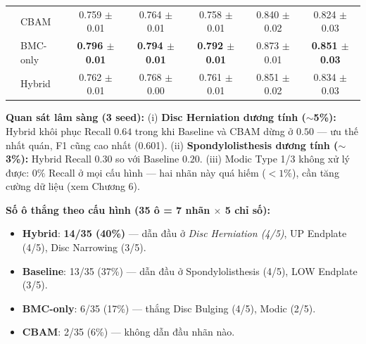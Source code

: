 \begin{table}[H]
{\begin{tabular}{llccccc}
 & CBAM     & 0.759 $\pm$ 0.01 & 0.764 $\pm$ 0.01 & 0.758 $\pm$ 0.01 & 0.840 $\pm$ 0.02 & 0.824 $\pm$ 0.03 \\
 & BMC-only & \textbf{0.796 $\pm$ 0.01} & \textbf{0.794 $\pm$ 0.01} & \textbf{0.792 $\pm$ 0.01} & 0.873 $\pm$ 0.01 & \textbf{0.851 $\pm$ 0.03} \\
 & Hybrid   & 0.762 $\pm$ 0.01 & 0.768 $\pm$ 0.00 & 0.761 $\pm$ 0.01 & 0.851 $\pm$ 0.02 & 0.834 $\pm$ 0.03 \\
\bottomrule
\end{tabular}%
}
\end{table}

\begin{table}[H]
\centering
\caption{Recall của các nhãn minority lâm sàng quan trọng (3-seed mean$\pm$std).}
\label{tab:spider_minority_recall}
\renewcommand{\arraystretch}{1.2}
\setlength{\tabcolsep}{4pt}
\end{table}

\textbf{Quan sát lâm sàng (3 seed):} (i) \textbf{Disc Herniation dương tính ($\sim$5\%):} Hybrid khôi phục Recall $0.64$ trong khi Baseline và CBAM dừng ở $0.50$ --- ưu thế nhất quán, F1 cũng cao nhất (0.601). (ii) \textbf{Spondylolisthesis dương tính ($\sim$3\%):} Hybrid Recall $0.30$ so với Baseline $0.20$. (iii) Modic Type 1/3 không xử lý được: $0\%$ Recall ở mọi cấu hình --- hai nhãn này quá hiếm ($<1\%$), cần tăng cường dữ liệu (xem Chương 6).

\textbf{Số ô thắng theo cấu hình (35 ô = 7 nhãn $\times$ 5 chỉ số):}
\begin{itemize}
    \item \textbf{Hybrid}: \textbf{14/35 (40\%)} --- dẫn đầu ở \emph{Disc Herniation (4/5)}, UP Endplate (4/5), Disc Narrowing (3/5).
    \item \textbf{Baseline}: 13/35 (37\%) --- dẫn đầu ở Spondylolisthesis (4/5), LOW Endplate (3/5).
    \item \textbf{BMC-only}: 6/35 (17\%) --- thắng Disc Bulging (4/5), Modic (2/5).
    \item \textbf{CBAM}: 2/35 (6\%) --- không dẫn đầu nhãn nào.
\end{itemize}

